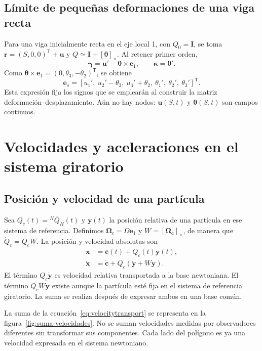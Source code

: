 \documentclass[11pt,a4paper,oneside]{report}
\newcommand{\vct}[1]{\bm{#1}}
\newcommand{\Id}{\mathbf I}
\newcommand{\tr}{\mathsf T}
\newcommand{\sk}[1]{[\bm{#1}]_{\times}}
\begin{document}
\subsection{Límite de pequeñas deformaciones de una viga recta}
Para una viga inicialmente recta en el eje local 1, con $Q_0=\Id$, se toma $\vct r=(S,0,0)^\tr+\vct u$ y $Q\simeq\Id+\sk\theta$. Al retener primer orden,
\begin{equation}
 \vct\gamma=\vct u'-\vct\theta\times\vct e_1,
 \qquad \vct\kappa=\vct\theta'.
\end{equation}
Como $\vct\theta\times\vct e_1=(0,\theta_3,-\theta_2)^\tr$, se obtiene
\begin{equation}
 \vct e_s=
 [u_1',\ u_2'-\theta_3,\ u_3'+\theta_2,\ \theta_1',\ \theta_2',\ \theta_3']^\tr.
 \label{eq:strainlinear}
\end{equation}
Esta expresión fija los signos que se emplearán al construir la matriz deformación--desplazamiento. Aún no hay nodos: $\vct u(S,t)$ y $\vct\theta(S,t)$ son campos continuos.

\section{Velocidades y aceleraciones en el sistema giratorio}
\subsection{Posición y velocidad de una partícula}
Sea $Q_c(t)={}^N\overline Q_H(t)$ y $\vct y(t)$ la posición relativa de una partícula en ese sistema de referencia. Definimos $\vct\Omega_c=\Omega\vct e_1$ y $W=\sk{\Omega_c}$, de manera que $\dot Q_c=Q_cW$. La posición y velocidad absolutas son
\begin{align}
 \vct x&=\vct c(t)+Q_c(t)\vct y(t),\\
 \dot{\vct x}&=\dot{\vct c}+Q_c(\dot{\vct y}+W\vct y).
 \label{eq:velocitytransport}
\end{align}
El término $Q_c\dot{\vct y}$ es velocidad relativa transportada a la base newtoniana. El término $Q_cW\vct y$ existe aunque la partícula esté fija en el sistema de referencia giratorio. La suma se realiza después de expresar ambos en una base común.

La suma de la ecuación~\eqref{eq:velocitytransport} se representa en la figura~\ref{fig:suma-velocidades}. No se suman velocidades medidas por observadores diferentes sin transformar sus componentes. Cada lado del polígono es ya una velocidad expresada en el sistema newtoniano.
\end{document}
